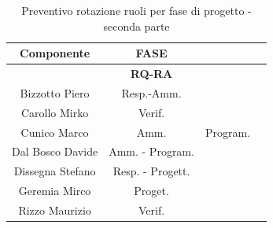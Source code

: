 \begin{table}[!h]
	\begin{center}
		  \begin{tabular}
			  {|c|c|c|c|}
			\hline
			\textbf{Componente} & \multicolumn{1}{|c|}{ \textbf{FASE} } \\
			\hline
			& \textbf{RQ-RA} \\
			\hline
			Bizzotto Piero & Resp.-Amm.   \\
			\hline
			Carollo Mirko & Verif.   \\
			\hline
			Cunico Marco & Amm. & Program.   \\
			\hline
			Dal Bosco Davide & Amm. - Program.  \\
			\hline
			Dissegna Stefano & Resp. - Progett.   \\
			\hline
			Geremia Mirco & Proget.   \\
			\hline
            Rizzo Maurizio  & Verif. \\
			\hline

		\end{tabular}
	\caption{Preventivo rotazione ruoli per fase di progetto - seconda parte} %
	\label{tab:TabellaRotazRuoliDue}
	\end{center}	
\end{table}
\newpage
{}

